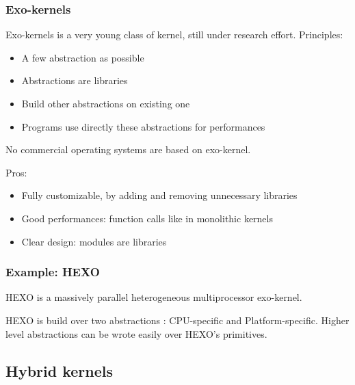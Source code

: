 \begin{frame}
  \frametitle{Exo-kernels}

  Exo-kernels is a very young class of kernel, still under research
  effort. Principles:

  \begin{itemize}
  \item
    A few abstraction as possible
  \item
    Abstractions are libraries
  \item
    Build other abstractions on existing one
  \item
    Programs use directly these abstractions for performances
  \end{itemize}

  \-

  No commercial operating systems are based on exo-kernel.

  \-

  Pros:

  \begin{itemize}
  \item
    Fully customizable, by adding and removing unnecessary libraries
  \item
    Good performances: function calls like in monolithic kernels
  \item
    Clear design: modules are libraries
  \end{itemize}

\end{frame}

%
%

\begin{frame}
  \frametitle{Example: HEXO}

  HEXO is a massively parallel heterogeneous multiprocessor
  exo-kernel.

  \begin{center}
  \end{center}

  HEXO is build over two abstractions : CPU-specific and
  Platform-specific. Higher level abstractions can be wrote easily
  over HEXO's primitives.

\end{frame}

%
%

\subsection{Hybrid kernels}

